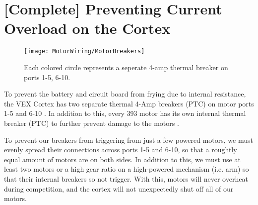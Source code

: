 \section{[Complete] Preventing Current Overload on the Cortex}

\begin{figure}[h]
    \centering
    \texttt{[image: MotorWiring/MotorBreakers]}
    \caption{
        Each colored circle represents a seperate 4-amp thermal breaker on ports 1-5, 6-10.
    }
\end{figure}

To prevent the battery and circuit board from frying due to internal resistance, the VEX Cortex has two separate thermal 4-Amp breakers (PTC) on motor ports 1-5 and 6-10 \cite{CortexBreakers}. In addition to this, every 393 motor has its own internal thermal breaker (PTC) to further prevent damage to the motors \cite{MotorBreakers}.

To prevent our breakers from triggering from just a few powered motors, we must evenly spread their connections across ports 1-5 and 6-10, so that a roughtly equal amount of motors are on both sides. In addition to this, we must use at least two motors or a high gear ratio on a high-powered mechanism (i.e. arm) so that their internal breakers so not trigger. With this, motors will never overheat during competition, and the cortex will not unexpectedly shut off all of our motors.

